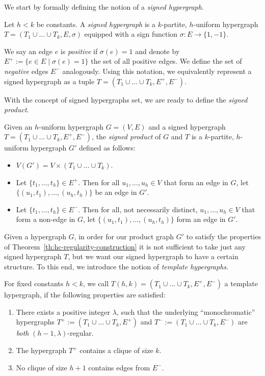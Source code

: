 \documentclass[a4paper,UKenglish,cleveref, autoref, thm-restate,numberwithinsect]{lipics-v2021}
\newcommand{\reg}{\lambda}
\begin{document}
\medskip
We start by formally defining the notion of a \emph{signed hypergraph}.
\begin{definition}
    Let $h<k$ be constants. A \emph{signed hypergraph} is a $k$-partite, $h$-uniform hypergraph $T = (T_1 \cup \dots\cup T_k, E, \sigma)$ equipped with a sign function $\sigma: E\to \{1,-1\}$. 
\end{definition}
We say an edge $e$ is \emph{positive} if $\sigma(e)=1$ and denote by $E^{+} := \{e\in E\mid \sigma(e) = 1\}$ the set of all positive edges. We define  the set of \emph{negative} edges $E^-$ analogously.
Using this notation, we equivalently represent a signed hypergraph as a tuple $T = (T_1\cup\dots \cup T_k, E^+,E^-)$.

With the concept of signed hypergraphs set, we are ready to define the \emph{signed product}.
\begin{definition}
    Given an $h$-uniform hypergraph $G=(V,E)$ and a signed hypergraph $T = (T_1\cup\dots\cup T_k, E^+,E^-)$, the \emph{signed product} of $G$ and $T$ is a $k$-partite, $h$-uniform hypergraph $G'$ defined as follows:
    \begin{itemize}
        \item $V(G') = V\times (T_1\cup \dots \cup T_k)$.
        \item Let $\{t_1,\dots,t_h\} \in E^+$. Then for all $u_1,\dots, u_h\in V$ that form an edge in $G$, let $\{(u_1,t_1),\dots, (u_h,t_h)\}$ be an edge in $G'$.
        \item Let $\{t_1,\dots,t_h\} \in E^-$. Then for all, not necessarily distinct, $u_1,\dots, u_h\in V$ that form a non-edge in $G$, let $\{(u_1,t_1),\dots, (u_h,t_h)\}$ form an edge in $G'$.

    \end{itemize}
\end{definition}
Given a hypergraph $G$, in order for our product graph $G'$ to satisfy the properties of {Theorem~\ref{th:hc-regularity-construction}} it is not sufficient to take just any signed hypergraph $T$, but we want our signed hypergraph to have a certain structure. 
To this end, we introduce the notion of \emph{template hypergraphs}.
\begin{definition}
    For fixed constants $h < k$, we call $T(h,k) = (T_1\cup \dots\cup T_k, E^+,E^-)$ a template hypergraph, if the following properties are satisfied:
    \begin{enumerate}
        \item\label{prop:template:1} There exists a positive integer $\reg$, such that the underlying ``monochromatic'' hypergraphs $T^+ := (T_1\cup\dots\cup T_k, E^+)$ and $T^-:=(T_1\cup\dots\cup T_k, E^-)$ are \emph{both} $(h-1, \reg)$-regular.
        \item\label{prop:template:2} The hypergraph $T^+$ contains a clique of size $k$.
        \item\label{prop:template:3} No clique of size $h+1$ contains edges from $E^-$.
    \end{enumerate}
\end{definition}
\end{document}

